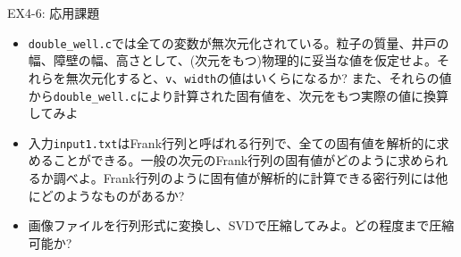 \begin{frame}[t,fragile]{EX4-6: 応用課題}
  \begin{itemize}
  \item[4-6-1] {\tt double\_well.c}では全ての変数が無次元化されている。粒子の質量、井戸の幅、障壁の幅、高さとして、(次元をもつ)物理的に妥当な値を仮定せよ。それらを無次元化すると、{\tt v}、{\tt width}の値はいくらになるか? また、それらの値から{\tt double\_well.c}により計算された固有値を、次元をもつ実際の値に換算してみよ
  \item[4-6-2] 入力{\tt input1.txt}はFrank行列と呼ばれる行列で、全ての固有値を解析的に求めることができる。一般の次元のFrank行列の固有値がどのように求められるか調べよ。Frank行列のように固有値が解析的に計算できる密行列には他にどのようなものがあるか?
  \item[4-6-3] 画像ファイルを行列形式に変換し、SVDで圧縮してみよ。どの程度まで圧縮可能か?
  \end{itemize}
\end{frame}
